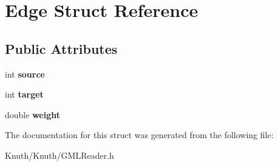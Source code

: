 \hypertarget{struct_edge}{}\section{Edge Struct Reference}
\label{struct_edge}
\subsection*{Public Attributes}
\begin{DoxyCompactItemize}
\item 
\mbox{\label{struct_edge_adcf410ae923d69e22ede2cd59ee80108}} 
int {\bfseries source}
\item 
\mbox{\label{struct_edge_aa39574b7bb4de6b41acd5c5c3d6331cc}} 
int {\bfseries target}
\item 
\mbox{\label{struct_edge_a6d0148402e635354c03a151c77fcbdd8}} 
double {\bfseries weight}
\end{DoxyCompactItemize}


The documentation for this struct was generated from the following file\+:\begin{DoxyCompactItemize}
\item 
Knuth/\+Knuth/G\+M\+L\+Reader.\+h\end{DoxyCompactItemize}

